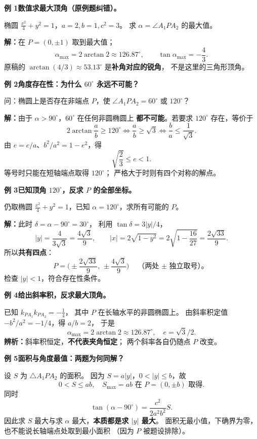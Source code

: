 \begin{examplebox}
\textbf{例 1\quad 数值求最大顶角（原例题纠错）。}

椭圆 $\frac{x^2}{4}+y^2=1$，$a=2,b=1,c^2=3$。
求 $\alpha=\angle A_1PA_2$ 的最大值。

\textbf{解：}在 $P=(0,\pm1)$ 取到最大值；
\[
\boxed{\alpha_{\max}=2\arctan2
\approx126.87^\circ},\qquad
\boxed{\tan\alpha_{\max}=-\frac43}.
\]
原稿的 $\arctan(4/3)\approx53.13^\circ$ 是\textbf{补角对应的锐角}，
不是这里的三角形顶角。

\medskip
\textbf{例 2\quad 角度存在性：为什么 $60^\circ$ 永远不可能？}

问：椭圆上是否存在非端点 $P$，使
$\angle A_1PA_2=60^\circ$ 或 $120^\circ$？

\textbf{解：}由于 $\alpha>90^\circ$，$60^\circ$ 在任何非圆椭圆上
\textbf{都不可能}。若要求 $120^\circ$ 存在，等价于
\[
2\arctan\frac ab\ge120^\circ
\iff \frac ab\ge\sqrt3
\iff \frac ba\le\frac1{\sqrt3}.
\]
由 $e=c/a$、$b^2/a^2=1-e^2$，得
\[
\boxed{\sqrt{\frac23}\le e<1}.
\]
等号时只能在短轴端点取得 $120^\circ$；
严格大于时则有四个对称的解点。

\medskip
\textbf{例 3\quad 已知顶角 $120^\circ$，反求 $P$ 的全部坐标。}

仍取椭圆 $\frac{x^2}{4}+y^2=1$，已知
$\alpha=120^\circ$，求所有可能的 $P$。

\textbf{解：}此时 $\delta=\alpha-90^\circ=30^\circ$，
利用 $\tan\delta=3|y|/4$，
\[
|y|=\frac4{3\sqrt3}=\frac{4\sqrt3}{9},
\qquad
|x|=2\sqrt{1-y^2}
=2\sqrt{1-\frac{16}{27}}
=\frac{2\sqrt{33}}9.
\]
所以\textbf{共有四点}：
\[
\boxed{P=\biggl(\pm\frac{2\sqrt{33}}9,\,
\pm\frac{4\sqrt3}9\biggr)}
\quad\text{（两处 $\pm$ 独立取号）。}
\]
检查 $|y|<1$，符合存在性条件。

\medskip
\textbf{例 4\quad 给出斜率积，反求最大顶角。}

已知 $k_{PA_1}k_{PA_2}=-\frac14$，
其中 $P$ 在长轴水平的非圆椭圆上。
由斜率积定值 $-b^2/a^2=-1/4$，得 $a/b=2$，
于是
\[
\boxed{\alpha_{\max}=2\arctan2\approx126.87^\circ},
\quad\boxed{e=\sqrt3/2}.
\]
\textbf{辨析：}斜率积恒定，\textbf{不代表夹角恒定}；
两个斜率各自仍随点 $P$ 改变。

\medskip
\textbf{例 5\quad 面积与角度最值：两题为何同解？}

设 $S$ 为 $\triangle A_1PA_2$ 的面积。
因为 $S=a|y|$，$0<|y|\le b$，故
\[
\boxed{0<S\le ab},\quad
S_{\max}=ab\text{ 在 }P=(0,\pm b)\text{ 取得}.
\]
同时
\[
\tan(\alpha-90^\circ)=\frac{c^2}{2a^2b^2}S.
\]
因此求 $S$ 最大与求 $\alpha$ 最大，\textbf{本质都是求 $|y|$ 最大}。
面积无最小值，下确界为零，也不能说长轴端点处取到最小面积
（因为 $P$ 被题设排除）。


\end{examplebox}

